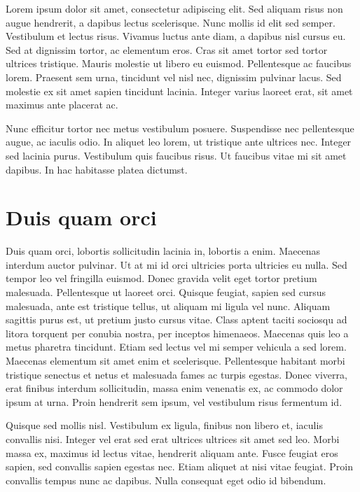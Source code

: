 \documentclass[twocolumn,a4paper,10pt]{article}
\begin{document}
Lorem ipsum dolor sit amet, consectetur adipiscing elit. Sed aliquam risus non augue hendrerit, a dapibus lectus
scelerisque. Nunc mollis id elit sed semper. Vestibulum et lectus risus. Vivamus luctus ante diam, a dapibus nisl
cursus eu. Sed at dignissim tortor, ac elementum eros. Cras sit amet tortor sed tortor ultrices tristique.
Mauris molestie ut libero eu euismod. Pellentesque ac faucibus lorem. Praesent sem urna, tincidunt vel nisl nec,
dignissim pulvinar lacus. Sed molestie ex sit amet sapien tincidunt lacinia. Integer varius laoreet erat, sit
amet maximus ante placerat ac.

Nunc efficitur tortor nec metus vestibulum posuere. Suspendisse nec pellentesque augue, ac iaculis odio.
In aliquet leo lorem, ut tristique ante ultrices nec. Integer sed lacinia purus. Vestibulum quis faucibus risus.
Ut faucibus vitae mi sit amet dapibus. In hac habitasse platea dictumst.

\section{Duis quam orci}

Duis quam orci, lobortis sollicitudin lacinia in, lobortis a enim. Maecenas interdum auctor pulvinar.
Ut at mi id orci ultricies porta ultricies eu nulla. Sed tempor leo vel fringilla euismod. Donec gravida velit
eget tortor pretium malesuada. Pellentesque ut laoreet orci. Quisque feugiat, sapien sed cursus malesuada,
ante est tristique tellus, ut aliquam mi ligula vel nunc. Aliquam sagittis purus est, ut pretium justo cursus vitae.
Class aptent taciti sociosqu ad litora torquent per conubia nostra, per inceptos himenaeos.
Maecenas quis leo a metus pharetra tincidunt. Etiam sed lectus vel mi semper vehicula a sed lorem.
Maecenas elementum sit amet enim et scelerisque.
Pellentesque habitant morbi tristique senectus et netus et malesuada fames ac turpis egestas.
Donec viverra, erat finibus interdum sollicitudin, massa enim venenatis ex, ac commodo dolor ipsum at urna.
Proin hendrerit sem ipsum, vel vestibulum risus fermentum id.

Quisque sed mollis nisl. Vestibulum ex ligula, finibus non libero et, iaculis convallis nisi.
Integer vel erat sed erat ultrices ultrices sit amet sed leo. Morbi massa ex, maximus id lectus vitae,
hendrerit aliquam ante. Fusce feugiat eros sapien, sed convallis sapien egestas nec. Etiam aliquet at
nisi vitae feugiat. Proin convallis tempus nunc ac dapibus. Nulla consequat eget odio id bibendum.
\end{document}
